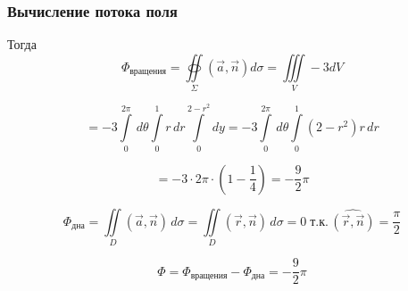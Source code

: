 \begin{frame}\frametitle{Вычисление потока поля}

	Тогда
	\begin{equation*}
		\Phi_{\text{вращения}} = \oiint\limits_{\Sigma}\left( \vec {a}, \vec {n} \right) d\sigma = \iiint\limits_V -3 dV
	\end{equation*}

	\begin{equation*}
		= -3 \int\limits_{0}^{2 \pi} \, d \theta
		\int\limits_{0}^{1} r \, dr
		\int\limits_{0}^{2-r^2} dy
		= -3 \int\limits_{0}^{2 \pi} \, d \theta
		\int\limits_{0}^{1} (2-r^2)r \, dr
	\end{equation*}

	\begin{equation*}
		= -3 \cdot 2 \pi \cdot
		(1 - \frac{1}{4})
		= - \frac{9}{2}\pi
	\end{equation*}

	\begin{equation*}
		\Phi_{\text{дна}} = \iint\limits_{D}(\vec{a},\vec{n}) \, d\sigma =  \iint\limits_{D}(\vec{r},\vec{n}) \, d\sigma = 0 \; \text{т.к.} \,  \widehat{(\vec{r}, \vec{n})} = \frac{\pi}{2}
	\end{equation*}

	\begin{equation*}
		\Phi = \Phi_{\text{вращения}} - \Phi_{\text{дна}} = -\frac{9}{2}\pi
	\end{equation*}
\end{frame}
